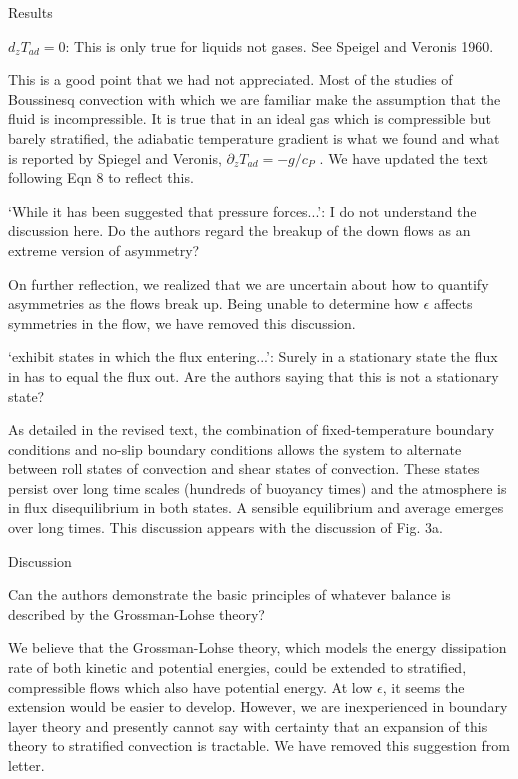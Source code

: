 \documentclass[aps, 11pt, singlecolumn]{revtex4-1} %
\begin{document}
\begin{singlespace}
\begin{myquotation}
Results

$d_z T_{ad} = 0$: This is only true for liquids not gases. See Speigel and
Veronis 1960.
\end{myquotation}
This is a good point that we had not appreciated.  Most of the studies of Boussinesq
convection with which we are familiar make the assumption that the fluid is incompressible.
It is true that in an ideal gas which is compressible but barely stratified, the
adiabatic temperature gradient is what we found and what is reported by
Spiegel and Veronis, $\partial_z T_{ad} = -g/c_P$ \cite{spiegel&veronis1960}.
We have updated the text following Eqn 8 to reflect this.

\begin{myquotation}
`While it has been suggested that pressure forces...': I do not
understand the discussion here. Do the authors regard the breakup of
the down flows as an extreme version of asymmetry?
\end{myquotation}
On further reflection, we realized that we are uncertain about how to
quantify asymmetries as the flows break up.  
Being unable to determine how $\epsilon$ affects symmetries in the
flow, we have removed this discussion.

\begin{myquotation}
`exhibit states in which the flux entering...': Surely in a
stationary state the flux in has to equal the flux out. Are the
authors saying that this is not a stationary state?
\end{myquotation}
As detailed in the revised text, the combination of fixed-temperature
boundary conditions and no-slip boundary conditions allows the system to alternate between
roll states of convection and shear states of convection.  These states persist over long
time scales (hundreds of buoyancy times) and the atmosphere is in flux disequilibrium in both states.
A sensible equilibrium and average emerges over long times.  This discussion appears with
the discussion of Fig. 3a.

\begin{myquotation}
Discussion

Can the authors demonstrate the basic principles of whatever balance
is described by the Grossman-Lohse theory?
\end{myquotation}
We believe that the Grossman-Lohse theory, which models the energy dissipation rate of both
kinetic and potential energies, could be extended to stratified, compressible flows which also
have potential energy.  At low $\epsilon$, it seems the extension would be easier to
develop. However, we are inexperienced in boundary layer theory and presently 
cannot say with certainty that an expansion of this theory to stratified convection is tractable. 
We have removed this suggestion from letter.  



\end{singlespace}
\end{document}
